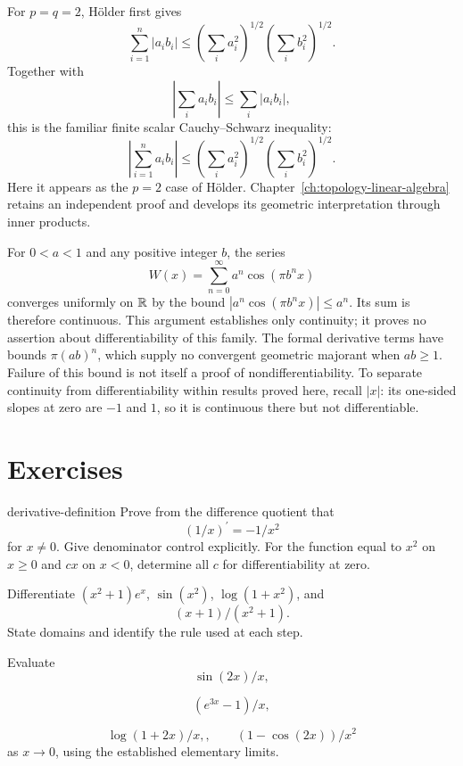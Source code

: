 For \(p=q=2\), H\"older first gives
\[
\sum_{i=1}^n|a_ib_i|
\leq
\left(\sum_i a_i^2\right)^{1/2}
\left(\sum_i b_i^2\right)^{1/2}.
\]
Together with
\[
\left|\sum_i a_ib_i\right|\leq\sum_i|a_ib_i|,
\]
this is the familiar finite scalar Cauchy--Schwarz inequality:
\[
\boxed{
\left|\sum_{i=1}^n a_ib_i\right|
\leq
\left(\sum_i a_i^2\right)^{1/2}
\left(\sum_i b_i^2\right)^{1/2}.}
\]
Here it appears as the \(p=2\) case of H\"older. Chapter~\ref{ch:topology-linear-algebra}
retains an independent proof and develops its geometric interpretation
through inner products.

\begin{example}
For $0<a<1$ and any positive integer $b$, the series
\[
W(x)=\sum_{n=0}^\infty a^n\cos(\pi b^n x)
\]
converges uniformly on $\mathbb{R}$ by the bound $|a^n\cos(\pi b^nx)|\leq a^n$.
Its sum is therefore continuous. This argument establishes only continuity;
it proves no assertion about differentiability of this family. The formal
derivative terms have bounds $\pi(ab)^n$, which supply no convergent
geometric majorant when $ab\geq1$. Failure of this bound is not itself a
proof of nondifferentiability. To separate continuity from differentiability
within results proved here, recall $|x|$: its one-sided slopes at zero
are $-1$ and $1$, so it is continuous there but not differentiable.
\end{example}



\section*{Exercises}

\begin{hexercise}{derivative-definition}
Prove from the difference quotient that
\[
(1/x)^{\prime}=-1/x^2
\]
 for $x\ne0$. Give denominator control explicitly. For the function equal to $x^2$ on $x\geq0$ and $cx$ on $x<0$, determine all $c$ for differentiability at zero.
\end{hexercise}

\begin{exercise}
Differentiate $(x^2+1)e^x$, $\sin(x^2)$, $\log(1+x^2)$, and
\[
(x+1)/(x^2+1).
\]
 State domains and identify the rule used at each step.
\end{exercise}

\begin{exercise}
Evaluate
\[
\sin(2x)/x,
\]

\[
(e^{3x}-1)/x,
\]

\[
\log(1+2x)/x,,\qquad (1-\cos(2x))/x^2
\]
 as $x\to0$, using the established elementary limits.
\end{exercise}

